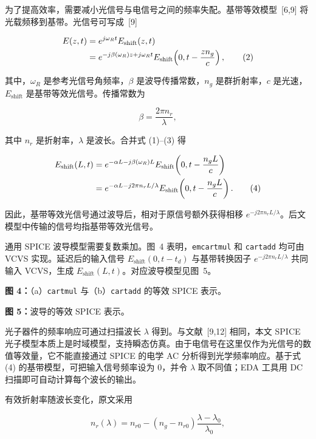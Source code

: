 \documentclass[11pt,a4paper]{ctexart}
\begin{document}
为了提高效率，需要减小光信号与电信号之间的频率失配。基带等效模型~[6,9] 将光载频移到基带。光信号可写成~[9]

\begin{align}
E(z,t)&=e^{j\omega_R t}E_{\mathrm{shift}}(z,t)\notag\\
&=e^{-j\beta(\omega_R)z+j\omega_R t}
E_{\mathrm{shift}}\!\left(0,t-\frac{zn_g}{c}\right),
\tag{2}
\end{align}

其中，$\omega_R$ 是参考光信号角频率，$\beta$ 是波导传播常数，$n_g$ 是群折射率，$c$ 是光速，$E_{\mathrm{shift}}$ 是基带等效光信号。传播常数为

\begin{equation}
\beta=\frac{2\pi n_r}{\lambda},
\tag{3}
\end{equation}

其中 $n_r$ 是折射率，$\lambda$ 是波长。合并式 (1)--(3) 得

\begin{align}
E_{\mathrm{shift}}(L,t)
&=e^{-\alpha L-j\beta(\omega_R)L}
E_{\mathrm{shift}}\!\left(0,t-\frac{n_gL}{c}\right)\notag\\
&=e^{-\alpha L-j2\pi n_rL/\lambda}
E_{\mathrm{shift}}\!\left(0,t-\frac{n_gL}{c}\right).
\tag{4}
\end{align}

因此，基带等效光信号通过波导后，相对于原信号额外获得相移 $e^{-j2\pi n_rL/\lambda}$。后文模型中传输的信号均指基带等效光信号。

通用 SPICE 波导模型需要复数乘加。图~4 表明，\texttt{emcartmul} 和 \texttt{cartadd} 均可由 VCVS 实现。延迟后的输入信号 $E_{\mathrm{shift}}(0,t-t_d)$ 与基带转换因子 $e^{-j2\pi n_rL/\lambda}$ 共同输入 VCVS，生成 $E_{\mathrm{shift}}(L,t)$。对应波导模型见图~5。

\noindent\textbf{图 4：}（a）\texttt{cartmul} 与（b）\texttt{cartadd} 的等效 SPICE 表示。\par
\noindent\textbf{图 5：}波导的等效 SPICE 表示。

光子器件的频率响应可通过扫描波长 $\lambda$ 得到。与文献~[9,12] 相同，本文 SPICE 光子模型本质上是时域模型，支持瞬态仿真。由于电信号在这里仅作为光信号的数值等效量，它不能直接通过 SPICE 的电学 AC 分析得到光学频率响应。基于式 (4) 的基带模型，可把输入信号频率设为 0，并令 $\lambda$ 取不同值；EDA 工具用 DC 扫描即可自动计算每个波长的输出。

有效折射率随波长变化，原文采用

\begin{equation}
n_r(\lambda)=n_{r0}-(n_g-n_{r0})\frac{\lambda-\lambda_0}{\lambda_0},
\tag{5}
\end{equation}
\end{document}
